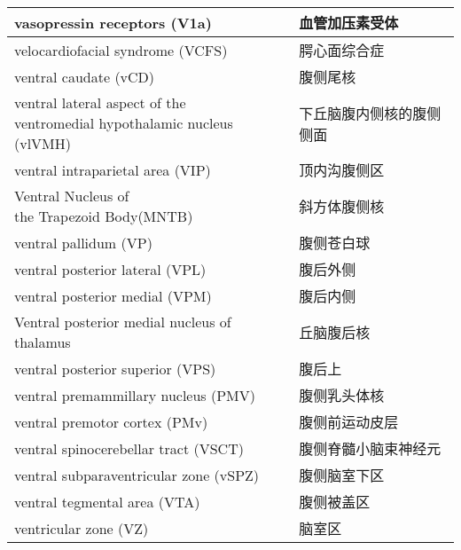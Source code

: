 \begin{longtable}{lll}
	\midrule
	vasopressin receptors (V1a)  && 血管加压素受体  \\
	
	\midrule
	velocardiofacial syndrome (VCFS)   && 腭心面综合症  \\
	
	\midrule
	ventral caudate (vCD)   && 腹侧尾核  \\
	
	\midrule
	\makecell[l]{ventral lateral aspect of the \\ventromedial hypothalamic nucleus (vlVMH)}   && 下丘脑腹内侧核的腹侧侧面  \\
	
	\midrule
	ventral intraparietal area (VIP)   && 顶内沟腹侧区  \\
	
	\midrule
	\makecell[l]{Ventral Nucleus of \\the Trapezoid Body(MNTB)}   && 斜方体腹侧核  \\
	
	\midrule
	ventral pallidum (VP)  && 腹侧苍白球  \\
	
	\midrule
	ventral posterior lateral (VPL)   && 腹后外侧  \\
	
	\midrule
	ventral posterior medial (VPM)   && 腹后内侧  \\
	
	\midrule
	Ventral posterior medial nucleus of thalamus   && 丘脑腹后核  \\
	
	\midrule
	ventral posterior superior (VPS)   && 腹后上  \\
	
	\midrule
	ventral premammillary nucleus (PMV)  && 腹侧乳头体核  \\
	
	\midrule
	ventral premotor cortex (PMv)   && 腹侧前运动皮层  \\
	
	\midrule
	ventral spinocerebellar tract (VSCT)   && 腹侧脊髓小脑束神经元  \\
	
	\midrule
	ventral subparaventricular zone (vSPZ)  && 腹侧脑室下区  \\
	
	\midrule
	ventral tegmental area (VTA)   && 腹侧被盖区  \\
	
	\midrule
	ventricular zone (VZ)   && 脑室区  \\
	

\end{longtable}
